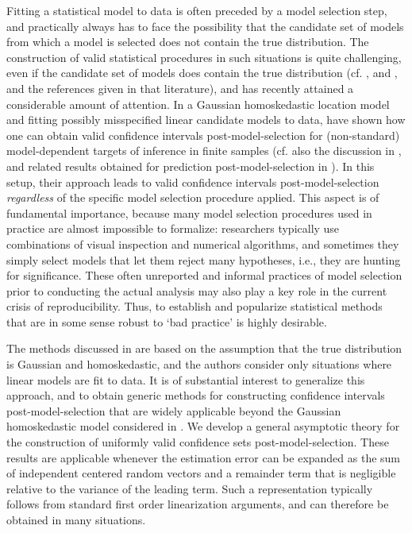 \documentclass[preprint]{imsart}
\numberwithin{equation}{section}
\begin{document}
Fitting a statistical model to data is often preceded by a model selection step, and practically always has to face the possibility that the candidate set of models from which a model is selected does not contain the true distribution. The construction of valid statistical procedures in such situations is quite challenging, even if the candidate set of models does contain the true distribution (cf. \cite{leeb05model, leeb2006, leeb08model}, \cite{kabaila06large} and \cite{Poe09a}, and the references given in that literature), and has recently attained a considerable amount of attention. In a Gaussian homoskedastic location model and fitting possibly misspecified linear candidate models to data, \cite{Berk13} have shown how one can obtain valid confidence intervals post-model-selection for (non-standard) model-dependent targets of inference in finite samples (cf. also the discussion in \cite{leeb13various}, and related results obtained for prediction post-model-selection in \cite{bachoc14valid}). In this setup, their approach leads to valid confidence intervals post-model-selection \emph{regardless} of the specific model selection procedure applied. This aspect is of fundamental importance, because many model selection procedures used in practice are almost impossible to formalize: researchers typically use combinations of visual inspection and numerical algorithms, and sometimes they simply select models that let them reject many hypotheses, i.e., they are hunting for significance. 
These often unreported and informal practices of model selection prior to conducting the actual analysis may also play a key role in the current crisis of reproducibility. Thus, to establish and popularize statistical methods that are in some sense robust to `bad practice' is highly desirable. 



The methods discussed in \cite{Berk13} are based on the assumption that the true distribution is Gaussian and homoskedastic, and the authors consider only situations where linear models are fit to data. It is of substantial interest to generalize this approach, and to obtain generic methods for constructing confidence intervals post-model-selection that are widely applicable beyond the Gaussian homoskedastic model considered in \cite{Berk13}. We develop a general asymptotic theory for the construction of uniformly valid confidence sets post-model-selection. These results are applicable whenever the estimation error can be expanded as the sum of independent centered random vectors and a remainder term that is negligible relative to the variance of the leading term. Such a representation typically follows from standard first order linearization arguments, and can therefore be obtained in many situations. 
\end{document}
